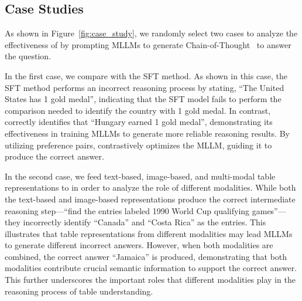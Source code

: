 \subsection{Case Studies}
As shown in Figure~\ref{fig:case_study}, we randomly select two cases to analyze the effectiveness of \method{} by prompting MLLMs to generate Chain-of-Thought~\cite{wei2022chain} to answer the question.

In the first case, we compare \method{} with the SFT method. As shown in this case, the SFT method performs an incorrect reasoning process by stating, ``The United States has 1 gold medal'', indicating that the SFT model fails to perform the comparison needed to identify the country with 1 gold medal. In contrast, \method{} correctly identifies that ``Hungary earned 1 gold medal'', demonstrating its effectiveness in training MLLMs to generate more reliable reasoning results. By utilizing preference pairs, \method{} contrastively optimizes the MLLM, guiding it to produce the correct answer.

In the second case, we feed text-based, image-based, and multi-modal table representations to \method{} in order to analyze the role of different modalities. While both the text-based and image-based representations produce the correct intermediate reasoning step—``find the entries labeled 1990 World Cup qualifying games''—they incorrectly identify ``Canada'' and ``Costa Rica'' as the entries. This illustrates that table representations from different modalities may lead MLLMs to generate different incorrect answers. However, when both modalities are combined, the correct answer ``Jamaica'' is produced, demonstrating that both modalities contribute crucial semantic information to support the correct answer. This further underscores the important roles that different modalities play in the reasoning process of table understanding.










